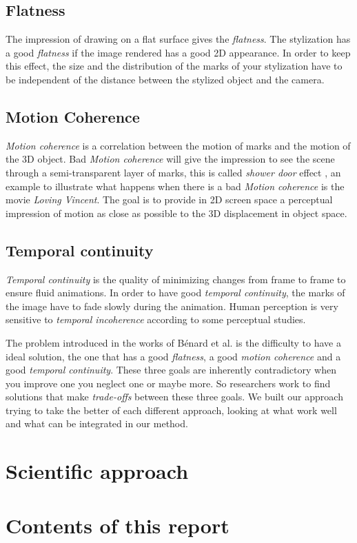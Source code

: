 \subsection{Flatness}

The impression of drawing on a flat surface gives the \textit{flatness}. The stylization has a good \textit{flatness} if the image rendered has a good 2D appearance. In order to keep this effect, the size and the distribution of the marks of your stylization have to be independent of the distance between the stylized object and the camera.

\subsection{Motion Coherence}

\textit{Motion coherence} is a correlation between the motion of marks and the motion of the 3D object. Bad \textit{Motion coherence} will give the impression to see the scene through a semi-transparent layer of marks, this is called \textit{shower door} effect \cite{meier_painterly_1996}, an example to illustrate what happens when there is a bad \textit{Motion coherence} is the movie \textit{Loving Vincent}\cite{LovingVincent}. The goal is to provide in 2D screen space a perceptual impression of motion as
close as possible to the 3D displacement in object space.

\subsection{Temporal continuity}

\textit{Temporal continuity} is the quality of minimizing changes from frame to frame to ensure fluid animations. In order to have good \textit{temporal continuity}, the marks of the image have to fade slowly during the animation. Human perception is very sensitive to \textit{temporal incoherence} according to some perceptual studies\cite{percept_studies, Schwarz_2009}. \newline


The problem introduced in the works of Bénard et al.\cite{benard_state---art_2011} is the difficulty to have a ideal solution, the one that has a good \textit{flatness}, a good \textit{motion coherence} and a good \textit{temporal continuity}. These three goals are inherently contradictory when you improve one you neglect one or maybe more. So researchers work to find solutions that make \textit{trade-offs} between these three goals. We built our approach trying to take the better of each different approach, looking at what work well and what can be integrated in our method.

\section{Scientific approach}

\section{Contents of this report}
